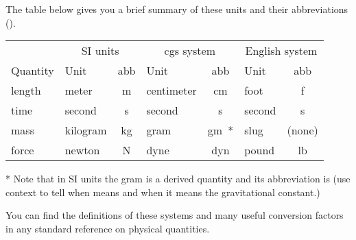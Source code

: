 {
The table below gives you a brief summary of these units and their
abbreviations ().
%
\begin{center}
\begin{tabular}{|l | l | c | l | c | l | c|} \hline
          & \multicolumn{2}{c|}{SI units} & \multicolumn{2}{c|}{cgs system} &
\multicolumn{2}{c|}{English system} \\ \cline{2-7}
 Quantity & Unit     & abb & Unit       & abb & Unit   & abb  \\ \hline
 \unit{length}   & \unit{meter}    &  m  & \unit{centimeter} & \unit{cm}  & \unit{foot}   &   \unit{f}  \\
 \unit{time}     & \unit{second}   &  s  & \unit{second}     & \unit{s}   & \unit{second} &   \unit{s}  \\
 \unit{mass}     & \unit{kilogram} & kg  & \unit{gram}       & \unit{gm*} & \unit{slug}   & (none) \\
 \unit{force}    & \unit{newton}   & N   & \unit{dyne}       & \unit{dyn} & \unit{pound}  & \unit{lb}   \\ \hline
\end{tabular}\end{center}
* Note that in SI units the gram is a derived quantity and its abbreviation is  (use
context to tell when  means  and when it means the gravitational constant.)

%
You can find the definitions of these systems and many useful conversion
factors in any standard reference on physical quantities.
%
%
}%
%
